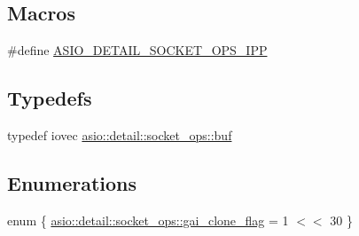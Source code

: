 \subsection*{Macros}
\begin{DoxyCompactItemize}
\item 
\#define \hyperlink{socket__ops_8ipp_a8f18060db6a1196cc0c92c0514cc72b1}{A\+S\+I\+O\+\_\+\+D\+E\+T\+A\+I\+L\+\_\+\+S\+O\+C\+K\+E\+T\+\_\+\+O\+P\+S\+\_\+\+I\+P\+P}
\end{DoxyCompactItemize}
\subsection*{Typedefs}
\begin{DoxyCompactItemize}
\item 
typedef iovec \hyperlink{namespaceasio_1_1detail_1_1socket__ops_aac19d854d021af5882325264a1833c65}{asio\+::detail\+::socket\+\_\+ops\+::buf}
\end{DoxyCompactItemize}
\subsection*{Enumerations}
\begin{DoxyCompactItemize}
\item 
enum \{ \hyperlink{namespaceasio_1_1detail_1_1socket__ops_aa44334e749c196d06de3476edb7691e3a0eac66584d9277444b0f147ff0a14ecc}{asio\+::detail\+::socket\+\_\+ops\+::gai\+\_\+clone\+\_\+flag} = 1 $<$$<$ 30
 \}
\end{DoxyCompactItemize}
